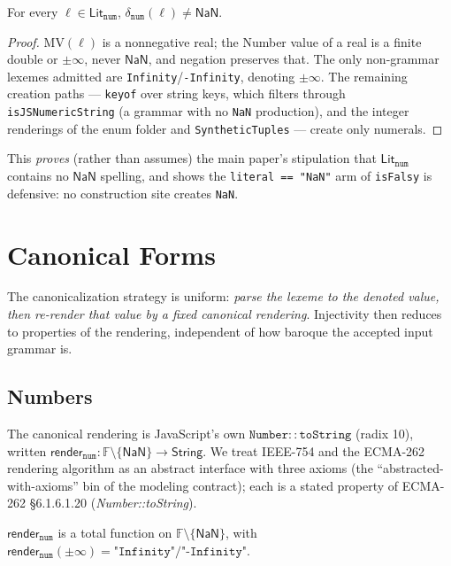 \documentclass[11pt]{article}
\newcommand{\String}{\mathsf{String}}
\newcommand{\Lit}[1]{\mathsf{Lit}_{\texttt{#1}}}
\newcommand{\render}{\mathsf{render}}
\newcommand{\Fdb}{\mathbb{F}}
\begin{document}
\begin{theorem}
\label{thm:nonan}
For every $\ell \in \Lit{num}$, $\delta_{\texttt{num}}(\ell) \neq
\mathsf{NaN}$.
\end{theorem}
\begin{proof}
$\mathrm{MV}(\ell)$ is a nonnegative real; the Number value of a real is a
finite double or $\pm\infty$, never $\mathsf{NaN}$, and negation
preserves that. The only non-grammar lexemes admitted are
\texttt{Infinity}/\texttt{-Infinity}, denoting $\pm\infty$. The
remaining creation paths --- \texttt{keyof} over string keys, which filters
through \texttt{isJSNumericString} (a grammar with no \texttt{NaN}
production), and the integer renderings of the enum folder and
\texttt{SyntheticTuples} --- create only numerals.
\end{proof}

This \emph{proves} (rather than assumes) the main paper's stipulation
that $\Lit{num}$ contains no $\mathsf{NaN}$ spelling, and shows the
\texttt{literal == "NaN"} arm of \texttt{isFalsy} is defensive: no
construction site creates \texttt{NaN}.

\section{Canonical Forms}
\label{sec:canonical}

The canonicalization strategy is uniform: \emph{parse the lexeme to the
denoted value, then re-render that value by a fixed canonical rendering}.
Injectivity then reduces to properties of the rendering, independent of
how baroque the accepted input grammar is.

\subsection{Numbers}
\label{sec:canon-num}

The canonical rendering is JavaScript's own
$\mathtt{Number::toString}$ (radix 10), written
$\render_{\texttt{num}} : \Fdb \setminus \{\mathsf{NaN}\} \to \String$.
We treat IEEE-754 and the ECMA-262 rendering algorithm as an abstract
interface with three axioms (the ``abstracted-with-axioms'' bin of the
modeling contract); each is a stated property of ECMA-262
\S6.1.6.1.20 (\emph{Number::toString}).

\begin{axiom}
\label{ax:numfun}
$\render_{\texttt{num}}$ is a total function on
$\Fdb \setminus \{\mathsf{NaN}\}$, with
$\render_{\texttt{num}}(\pm\infty) = \texttt{"Infinity"} /
\texttt{"-Infinity"}$.
\end{axiom}
\end{document}
